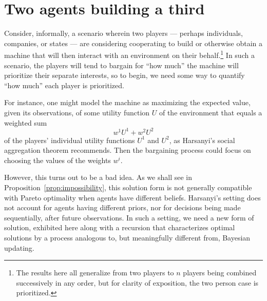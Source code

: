 \documentclass{article}
\newcommand{\bred}[1]{{\color{red}{#1}}}
\newcommand{\prop}[1]{Proposition~\ref{prop:#1}}
\begin{document}
\section{Two agents building a third}

Consider, informally, a scenario wherein two players --- perhaps individuals, companies, or states --- are considering cooperating to build or otherwise obtain a machine that will then interact with an environment on their behalf.\footnote{The results here all generalize from two players to $n$ players being combined successively in any order, but for clarity of exposition, the two person case is prioritized.} In such a scenario, the players will tend to bargain for ``how much'' the machine will prioritize their separate interests, so to begin, we need some way to quantify ``how much'' each player is prioritized.

For instance, one might model the machine as maximizing the expected value, given its observations, of some utility function $U$ of the environment that equals a weighted sum 
\begin{equation}\label{eqn:harsanyi}
w^1U^1 + w^2U^2
\end{equation}
of the players' individual utility functions $U^1$ and $U^2$, as Harsanyi's social aggregation theorem \citep{harsanyi1980cardinal} recommends.  Then the bargaining process could focus on choosing the values of the weights $w^i$.  

However, this turns out to be a bad idea.  As we shall see in \prop{impossibility}, this solution form is not generally compatible with Pareto optimality when agents have different beliefs.  Harsanyi's setting does not account for agents having different priors, nor for decisions being made sequentially, after future observations.  In such a setting, we need a new form of solution, exhibited here along with a recursion that characterizes optimal solutions by a process analogous to, but meaningfully different from, Bayesian updating.
\end{document}
